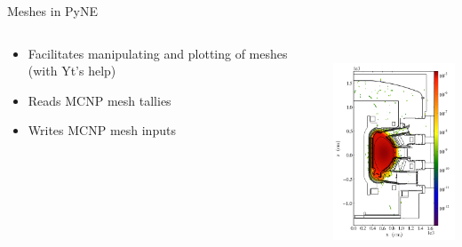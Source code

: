 \documentclass[xcolor=x11names,compress]{beamer}
\renewcommand{\(}{\begin{columns}}
\renewcommand{\)}{\end{columns}}
\newcommand{\<}[1]{\begin{column}{#1}}
\renewcommand{\>}{\end{column}}
\begin{document}
\begin{frame}{Meshes in PyNE}
    \begin{columns}
        \begin{column}{0.45\textwidth}
            \begin{itemize}
                \item Facilitates manipulating and plotting of meshes (with Yt's help) 
                \item Reads MCNP mesh tallies
                \item Writes MCNP mesh inputs
            \end{itemize}
  	    \end{column}
 	    \begin{column}{0.45\textwidth}
            \includegraphics[height=2.5in,clip]{flux_slice.png}  
        \end{column}
    \end{columns}
    
    
\end{frame}
\end{document}
